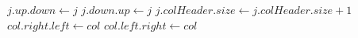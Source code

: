 \documentclass[12pt]{article}
\newcounter{row}
\newcounter{col}
\begin{document}
\begin{algorithm}
\label{uncover}
\begin{algorithmic}
\State $j.up.down \gets j$
\State $j.down.up \gets j$
\State $j.colHeader.size \gets j.colHeader.size + 1$
\EndFor
\EndFor
\State $col.right.left \gets col$
\State $col.left.right \gets col$
\EndProcedure
\end{algorithmic}
\end{algorithm}
\end{document}
